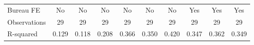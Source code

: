 {\begin{tabular}{l*{9}{c}}
Bureau FE   &          No         &          No         &          No         &          No         &          No         &          No         &         Yes         &         Yes         &         Yes         \\
Observations&          29         &          29         &          29         &          29         &          29         &          29         &          29         &          29         &          29         \\
R-squared   &       0.129         &       0.118         &       0.208         &       0.366         &       0.350         &       0.420         &       0.347         &       0.362         &       0.349         \\
\bottomrule
\end{tabular}
}
